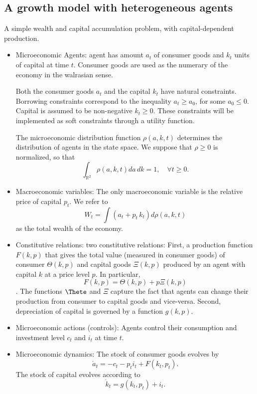 \documentclass{article}
\begin{document}
\subsection{A growth model with heterogeneous agents}
    A simple wealth and capital accumulation problem, with capital-dependent production.

\begin{itemize}
    \item Microeconomic Agents: agent has amount $a_t$ of consumer goods and $k_t$
    units of capital at time $t$. Consumer goods are used as the numerary of the economy
    in the walrasian sense.

    Both the consumer goods $a_t$ and the capital $k_t$ have natural constraints. 
    Borrowing constraints correspond to the inequality $a_t \geq a_0$, for some $a_0 \leq 0$.
    Capital is assumed to be non-negative $k_t \geq 0$. These constraints will be implemented
    as soft constraints through a utility function.

    The microeconomic distribution function $\rho(a,k,t)$ determines the distribution
    of agents in the state space. We suppose that $\rho \geq 0$ is normalized, so that
    $$
    \int_{\mathbb{R}^2} \rho(a,k,t) da\, dk = 1,\quad \forall t\geq 0.
    $$
    \item Macroeconomic variables: The only macroeconomic variable is the relative price
    of capital $p_t$. We refer to 
    $$
    W_t = \int (a_t + p_t\, k_t) d\rho(a,k,t)
    $$
    as the total wealth of the economy.
    \item Constitutive relations: two constitutive relations:
    First, a production function $F(k,p)$ that gives the total value (measured in consumer goods) 
    of consumer $\Theta(k,p)$ and capital goods $\Xi(k,p)$ produced by an agent with capital $k$
    at a price level $p$. In particular, $$ F(k,p) = \Theta(k,p) + p\Xi(k,p) $$.
    The functions $\Thete$ and $\Xi$ capture the fact that agents can change their production
    from consumer to capital goods and vice-versa.
    Second, depreciation of capital is governed by a function $g(k,p)$.

    \item Microeconomic actions (controls): 
    Agents control their consumption and investment level $c_t$ and $i_t$ at time $t$.

    \item Microeconomic dynamics:
    The stock of consumer goods evolves by $$\dot a_t = - c_t - p_t i_t + F(k_t, p_t).$$
    The stock of capital evolves according to $$\dot k_t = g(k_t,p_t) + i_t.$$ 


\end{itemize}
\end{document}
